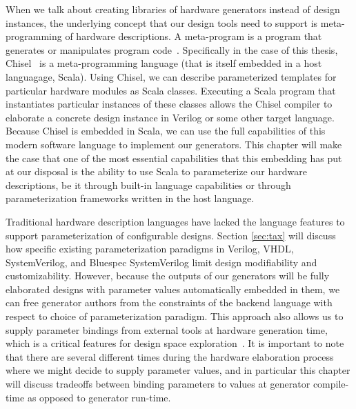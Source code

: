 When we talk about creating libraries of hardware generators instead of design instances,
the underlying concept that our design tools need to support is meta-programming of hardware descriptions.
A meta-program is a program that generates or manipulates program code~\cite{templates}.
Specifically in the case of this thesis, Chisel~\cite{chisel} is a meta-programming language (that is itself embedded in a host languagage, Scala).
Using Chisel, we can describe parameterized templates for particular hardware modules as Scala classes.
Executing a Scala program that instantiates particular instances of these classes allows the Chisel compiler
to elaborate a concrete design instance in Verilog or some other target language.
Because Chisel is embedded in Scala, we can use the full capabilities of this modern software language to implement our generators.
This chapter will make the case that one of the most essential capabilities that this embedding has put at our disposal
is the ability to use Scala to parameterize our hardware descriptions,
be it through built-in language capabilities or through parameterization frameworks written in the host language.

Traditional hardware description languages have lacked the language features to support parameterization of configurable designs.
Section \ref{sec:tax} will discuss how specific existing parameterization paradigms in Verilog, VHDL, SystemVerilog, and Bluespec SystemVerilog limit design modifiability and customizability.
However, because the outputs of our generators will be fully elaborated designs with parameter values  automatically embedded in them,
we can free generator authors from the constraints of the backend language with respect to choice of parameterization paradigm.
This approach also allows us to supply parameter bindings from external tools at hardware generation time,
which is a critical features for design space exploration~\cite{shacham2011chip}.
It is important to note that there are several different times during the hardware elaboration process where
we might decide to supply parameter values, and in particular this chapter will discuss tradeoffs between
binding parameters to values at generator compile-time as opposed to generator run-time.

